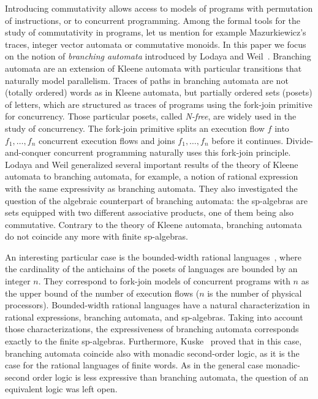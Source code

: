 \documentclass{CSML}
\begin{document}
Introducing commutativity allows access to models of programs with permutation of instructions, or to concurrent programming. Among the formal tools for the study of commutativity in programs, let us mention for example Mazurkiewicz's traces, integer vector automata or commutative monoids. In this paper we focus on the notion of \emph{branching automata} introduced by Lodaya and Weil~\cite{lodaya98kleene,LW98:Algebra,LW00:sp,lodaya01kleene}. Branching automata are an extension of Kleene automata with particular transitions that naturally model parallelism. Traces of paths in branching automata are not (totally ordered) words as in Kleene automata, but partially ordered sets (posets) of letters, which are structured as traces of programs using the fork-join primitive for concurrency. Those particular posets, called \emph{N-free}, are widely used in the study of concurrency. The fork-join primitive splits an execution flow $f$ into $f_1,\dots,f_n$ concurrent execution flows and joins $f_1,\dots,f_n$ before it continues. Divide-and-conquer concurrent programming naturally uses this fork-join principle. Lodaya and Weil generalized several important results of the theory of Kleene automata to branching automata, for example, a notion of rational expression with the same expressivity as branching automata. They also investigated the question of the algebraic counterpart of branching automata: the sp-algebras are sets equipped with two different associative products, one of them being also commutative. Contrary to the theory of Kleene automata, branching automata do not coincide any more with finite sp-algebras. 

An interesting particular case is the bounded-width rational languages~\cite{LW00:sp}, where the cardinality of the antichains of the posets of languages are bounded by an integer $n$. They correspond to fork-join models of concurrent programs with $n$ as the upper bound of the number of execution flows ($n$ is the number of physical processors). Bounded-width rational languages have a natural characterization in rational expressions, branching automata, and sp-algebras. Taking into account those characterizations, the expressiveness of branching automata corresponds exactly to the finite sp-algebras. Furthermore, Kuske~\cite{Kus00:SPInf} proved that in this case, branching automata coincide also with monadic second-order logic, as it is the case for the rational languages of finite words. As in the general case monadic-second order logic is less expressive than branching automata, the question of an equivalent logic was left open.
\end{document}
